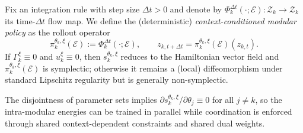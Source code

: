 \documentclass{article} %
\begin{document}
Fix an integration rule with step size $\Delta t>0$ and denote by $\Phi_{k}^{\Delta t}(\cdot;\mathcal E):\mathcal Z_k\to\mathcal Z_k$
its time-$\Delta t$ flow map.
We define the (deterministic) \emph{context-conditioned modular policy} as the rollout operator
\begin{equation}
\label{eq:module_policy_operator}
 \pi_k^{\theta_k,\xi}(\mathcal E):=\Phi_{k}^{\Delta t}(\cdot;\mathcal E),\qquad z_{k,t+\Delta t}=\pi_k^{\theta_k,\xi}(\mathcal E)(z_{k,t}).
\end{equation}
If $\Gamma_k^{\xi}\equiv 0$ and $u_k^{\xi}\equiv 0$, then $s_k^{\theta_k,\xi}$ reduces to the Hamiltonian vector field and
$\pi_k^{\theta_k,\xi}(\mathcal E)$ is symplectic; otherwise it remains a (local) diffeomorphism under standard Lipschitz
regularity but is generally non-symplectic.

The disjointness of parameter sets implies $\partial s_k^{\theta_k,\xi}/\partial\theta_j\equiv 0$ for all $j\neq k$,
so the intra-modular energies can be trained in parallel while coordination is enforced through shared context-dependent
constraints and shared dual weights.
\end{document}
